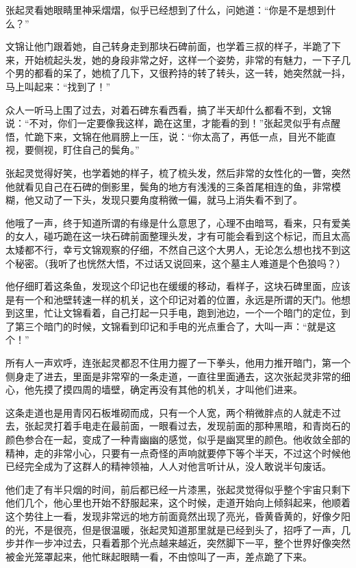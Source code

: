 张起灵看她眼睛里神采熠熠，似乎已经想到了什么，问她道：“你是不是想到什么？”

文锦让他门跟着她，自己转身走到那块石碑前面，也学着三叔的样子，半跪了下来，开始梳起头发，她的身段非常之好，这样一个姿势，非常的有魅力，一下子几个男的都看的呆了，她梳了几下，又很矜持的转了转头，这一转，她突然就一抖，马上叫起来：“找到了！”

众人一听马上围了过去，对着石碑东看西看，搞了半天却什么都看不到，文锦说：“不对，你们一定要像我这样，跪在这里，才能看的到！”张起灵似乎有点醒悟，忙跪下来，文锦在他肩膀上一压，说：“你太高了，再低一点，目光不能直视，要侧视，盯住自己的鬓角。”

张起灵觉得好笑，也学着她的样子，梳了梳头发，然后非常的女性化的一瞥，突然他就看见自己在石碑的倒影里，鬓角的地方有浅浅的三条首尾相连的鱼，非常模糊，他又动了一下头，发现只要角度稍微一偏，就马上消失看不到了。

他哦了一声，终于知道所谓的有缘是什么意思了，心理不由暗骂，看来，只有爱美的女人，碰巧跪在这一块石碑前面整理头发，才有可能会看到这个标记，而且太高太矮都不行，幸亏文锦观察的仔细，不然自己这个大男人，无论怎么想也找不到这个秘密。（我听了也恍然大悟，不过话又说回来，这个墓主人难道是个色狼吗？）

他仔细盯着这条鱼，发现这个印记也在缓缓的移动，看样子，这块石碑里面，应该是有一个和池壁转速一样的机关，这个印记对着的位置，永远是所谓的天门。他想到这里，忙让文锦看着，自己打起一只手电，跑到池边，一个一个暗门的定位，到了第三个暗门的时候，文锦看到印记和手电的光点重合了，大叫一声：“就是这个！”

所有人一声欢呼，连张起灵都忍不住用力握了一下拳头，他用力推开暗门，第一个侧身走了进去，里面是非常窄的一条走道，一直往里面通去，这次张起灵非常的细心，他先摸了摸四周的墙壁，确定再没有其他的机关，才叫他们进来。

这条走道也是用青冈石板堆砌而成，只有一个人宽，两个稍微胖点的人就走不过去，张起灵打着手电走在最前面，一眼看过去，发现前面的那种黑暗，和青岗石的颜色参合在一起，变成了一种青幽幽的感觉，似乎是幽冥里的颜色。他收敛全部的精神，走的非常小心，只要有一点奇怪的声响就要停下等个半天，不过这个时候他已经完全成为了这群人的精神领袖，人人对他言听计从，没人敢说半句废话。

他们走了有半只烟的时间，前后都已经一片漆黑，张起灵觉得似乎整个宇宙只剩下他们几个，他心里也开始不舒服起来，这个时候，走道开始向上倾斜起来，他顺着这个势往上一看，发现非常远的地方前面竟然出现了亮光，昏黄昏黄的，好像夕阳的光，不是很亮，但是很温暖，张起灵知道那里就是已经到头了，招呼了一声，几步并作一步冲过去，只看着那个光点越来越近，突然脚下一平，整个世界好像突然被金光笼罩起来，他忙眯起眼睛一看，不由惊叫了一声，差点跪了下来。

